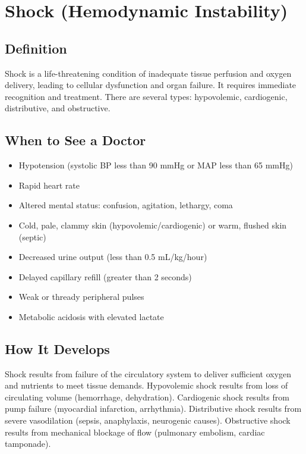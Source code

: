 \chapter{Shock (Hemodynamic Instability)}

\section*{Definition}
Shock is a life-threatening condition of inadequate tissue perfusion and oxygen delivery, leading to cellular dysfunction and organ failure. It requires immediate recognition and treatment. There are several types: hypovolemic, cardiogenic, distributive, and obstructive.

\section*{When to See a Doctor}
\begin{itemize}
\item Hypotension (systolic BP less than 90 mmHg or MAP less than 65 mmHg)
\item Rapid heart rate
\item Altered mental status: confusion, agitation, lethargy, coma
\item Cold, pale, clammy skin (hypovolemic/cardiogenic) or warm, flushed skin (septic)
\item Decreased urine output (less than 0.5 mL/kg/hour)
\item Delayed capillary refill (greater than 2 seconds)
\item Weak or thready peripheral pulses
\item Metabolic acidosis with elevated lactate
\end{itemize}

\section*{How It Develops}
Shock results from failure of the circulatory system to deliver sufficient oxygen and nutrients to meet tissue demands. Hypovolemic shock results from loss of circulating volume (hemorrhage, dehydration). Cardiogenic shock results from pump failure (myocardial infarction, arrhythmia). Distributive shock results from severe vasodilation (sepsis, anaphylaxis, neurogenic causes). Obstructive shock results from mechanical blockage of flow (pulmonary embolism, cardiac tamponade).

